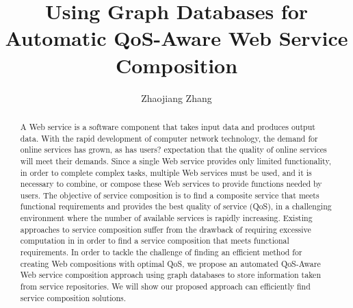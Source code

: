 \documentclass[11pt
              , a4paper
              , twoside
              , openright
              ]{report}
\title{Using Graph Databases for Automatic QoS-Aware Web Service Composition}
\author{Zhaojiang Zhang}
\date{}
\begin{document}
\frontmatter




\begin{abstract}
A Web service is a software component that takes input data and produces output data. With the rapid development of computer network technology, the demand for online services has grown, as has users? expectation that the quality of online services will meet their demands. Since a single Web service provides only limited functionality, in order to complete complex tasks, multiple Web services must be used, and it is necessary to combine, or compose these Web services to provide functions needed by users. The objective of service composition is to find a composite service that meets functional requirements and provides the best quality of service (QoS), in a challenging environment where the number of available services is rapidly increasing. Existing approaches to service composition suffer from the drawback of requiring excessive computation in in order to find a service composition that meets functional requirements. In order to tackle the challenge of finding an efficient method for creating Web compositions with optimal QoS, we propose an automated QoS-Aware Web service composition approach using graph databases to store information taken from service repositories. We will show our proposed approach can efficiently find service composition solutions. \end{abstract}


\maketitle



\tableofcontents



\mainmatter










\backmatter



%


\end{document}
